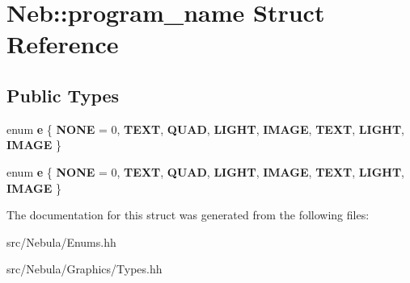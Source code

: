 \hypertarget{structNeb_1_1program__name}{\section{\-Neb\-:\-:program\-\_\-name \-Struct \-Reference}
\label{structNeb_1_1program__name}
}
\subsection*{\-Public \-Types}
\begin{DoxyCompactItemize}
\item 
enum {\bfseries e} \{ \*
{\bfseries \-N\-O\-N\-E} =  0, 
{\bfseries \-T\-E\-X\-T}, 
{\bfseries \-Q\-U\-A\-D}, 
{\bfseries \-L\-I\-G\-H\-T}, 
\*
{\bfseries \-I\-M\-A\-G\-E}, 
{\bfseries \-T\-E\-X\-T}, 
{\bfseries \-L\-I\-G\-H\-T}, 
{\bfseries \-I\-M\-A\-G\-E}
 \}
\item 
enum {\bfseries e} \{ \*
{\bfseries \-N\-O\-N\-E} =  0, 
{\bfseries \-T\-E\-X\-T}, 
{\bfseries \-Q\-U\-A\-D}, 
{\bfseries \-L\-I\-G\-H\-T}, 
\*
{\bfseries \-I\-M\-A\-G\-E}, 
{\bfseries \-T\-E\-X\-T}, 
{\bfseries \-L\-I\-G\-H\-T}, 
{\bfseries \-I\-M\-A\-G\-E}
 \}
\end{DoxyCompactItemize}


\-The documentation for this struct was generated from the following files\-:\begin{DoxyCompactItemize}
\item 
src/\-Nebula/\-Enums.\-hh\item 
src/\-Nebula/\-Graphics/\-Types.\-hh\end{DoxyCompactItemize}
